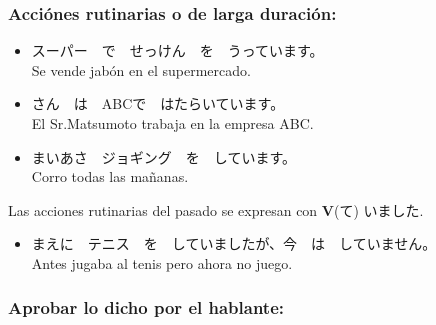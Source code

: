 \documentclass[a4paper,12pt,oneside]{report}
\def\bv{\textbf{V}} %
\begin{document}
\begin{CJK*}{UTF8}{min}
      \subsubsection{Acci\'ones rutinarias o de larga duraci\'on:}
        \fbox{\bv(て) います}

        \begin{itemize}
          \item スーパー　で　せっけん　を　うっています。\\
                Se vende jab\'on en el supermercado.
          \item {}さん　は　ABCで　はたらいています。\\
                El Sr.Matsumoto trabaja en la empresa ABC.
          \item まいあさ　ジョギング　を　しています。\\
                Corro todas las mañanas.
        \end{itemize}
        \hfill

        Las acciones rutinarias del pasado se expresan con \bv(て) いました.

        \begin{itemize}
          \item まえに　テニス　を　していましたが、今　は　していません。\\
                Antes jugaba al tenis pero ahora no juego.
        \end{itemize}

      \subsubsection{Aprobar lo dicho por el hablante:}


\end{CJK*}
\end{document}
